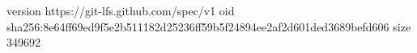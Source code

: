 version https://git-lfs.github.com/spec/v1
oid sha256:8e64ff69ed9f5e2b511182d25236ff59b5f24894ee2af2d601ded3689befd606
size 349692
